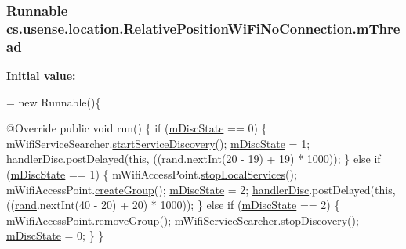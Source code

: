 \subsubsection[{m\+Thread}]{\setlength{\rightskip}{0pt plus 5cm}Runnable cs.\+usense.\+location.\+Relative\+Position\+Wi\+Fi\+No\+Connection.\+m\+Thread\hspace{0.3cm}{\ttfamily [private]}}\label{classcs_1_1usense_1_1location_1_1_relative_position_wi_fi_no_connection_ad2f797eb0aaa8e40db0ed90c3469d05d}
{\bfseries Initial value\+:}
\begin{DoxyCode}
= \textcolor{keyword}{new} Runnable()\{

        @Override
        \textcolor{keyword}{public} \textcolor{keywordtype}{void} run() \{
            \textcolor{keywordflow}{if} (\hyperlink{classcs_1_1usense_1_1location_1_1_relative_position_wi_fi_no_connection_a8d3612afa4159807065cacc3ac300ba9}{mDiscState} == 0) \{
                mWifiServiceSearcher.\hyperlink{classcs_1_1usense_1_1location_1_1_wifi_service_searcher_ae27d4b0c7e10b9557e9408520b42a784}{startServiceDiscovery}();
                \hyperlink{classcs_1_1usense_1_1location_1_1_relative_position_wi_fi_no_connection_a8d3612afa4159807065cacc3ac300ba9}{mDiscState} = 1;
                \hyperlink{classcs_1_1usense_1_1location_1_1_relative_position_wi_fi_no_connection_a651d0eb8ab40a9aafc59a938acee143c}{handlerDisc}.postDelayed(\textcolor{keyword}{this}, ((\hyperlink{classcs_1_1usense_1_1location_1_1_relative_position_wi_fi_no_connection_aba70fe571fbd9600ef45daeb6b8ff04a}{rand}.nextInt(20 - 19) + 19) * 1000));
            \} \textcolor{keywordflow}{else}  \textcolor{keywordflow}{if} (\hyperlink{classcs_1_1usense_1_1location_1_1_relative_position_wi_fi_no_connection_a8d3612afa4159807065cacc3ac300ba9}{mDiscState} == 1) \{
                mWifiAccessPoint.\hyperlink{classcs_1_1usense_1_1location_1_1_wifi_access_point_a49df2159322431dc978cca719e3700c1}{stopLocalServices}();
                mWifiAccessPoint.\hyperlink{classcs_1_1usense_1_1location_1_1_wifi_access_point_a7afd9a125fb7bf6dbc21494896134bda}{createGroup}();
                \hyperlink{classcs_1_1usense_1_1location_1_1_relative_position_wi_fi_no_connection_a8d3612afa4159807065cacc3ac300ba9}{mDiscState} = 2;
                \hyperlink{classcs_1_1usense_1_1location_1_1_relative_position_wi_fi_no_connection_a651d0eb8ab40a9aafc59a938acee143c}{handlerDisc}.postDelayed(\textcolor{keyword}{this}, ((\hyperlink{classcs_1_1usense_1_1location_1_1_relative_position_wi_fi_no_connection_aba70fe571fbd9600ef45daeb6b8ff04a}{rand}.nextInt(40 - 20) + 20) * 1000));
            \} \textcolor{keywordflow}{else} \textcolor{keywordflow}{if} (\hyperlink{classcs_1_1usense_1_1location_1_1_relative_position_wi_fi_no_connection_a8d3612afa4159807065cacc3ac300ba9}{mDiscState} == 2) \{
                mWifiAccessPoint.\hyperlink{classcs_1_1usense_1_1location_1_1_wifi_access_point_a78c51a45a27a22375d51105a5baf1a60}{removeGroup}();
                mWifiServiceSearcher.\hyperlink{classcs_1_1usense_1_1location_1_1_wifi_service_searcher_a588de68bec82e44ae9da3db878a3548c}{stopDiscovery}();
                \hyperlink{classcs_1_1usense_1_1location_1_1_relative_position_wi_fi_no_connection_a8d3612afa4159807065cacc3ac300ba9}{mDiscState} = 0;
            \}
        \}
        

\end{DoxyCode}

